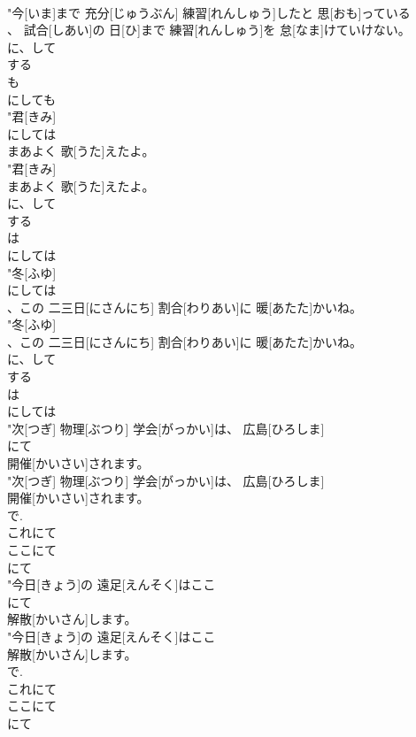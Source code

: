 \documentclass[8pt]{extreport}
\begin{document}
\begin{CJK}{UTF8}{min}
\\	"今[いま]まで 充分[じゅうぶん] 練習[れんしゅう]したと 思[おも]っている
\\	、 試合[しあい]の 日[ひ]まで 練習[れんしゅう]を 怠[なま]けていけない。
\\	に、して 
\\	する 
\\	も	
\\	にしても
\\	"君[きみ]
\\	にしては
\\	まあよく 歌[うた]えたよ。
\\	"君[きみ]
\\	まあよく 歌[うた]えたよ。
\\	に、して 
\\	する 
\\	は 
\\	にしては
\\	"冬[ふゆ]
\\	にしては
\\	、この 二三日[にさんにち] 割合[わりあい]に 暖[あたた]かいね。
\\	"冬[ふゆ]
\\	、この 二三日[にさんにち] 割合[わりあい]に 暖[あたた]かいね。
\\	に、して 
\\	する 
\\	は 
\\	にしては
\\	"次[つぎ] 物理[ぶつり] 学会[がっかい]は、 広島[ひろしま]
\\	にて
\\	開催[かいさい]されます。
\\	"次[つぎ] 物理[ぶつり] 学会[がっかい]は、 広島[ひろしま]
\\	開催[かいさい]されます。
\\	で. 
\\	これにて 
\\	ここにて 
\\	にて
\\	"今日[きょう]の 遠足[えんそく]はここ
\\	にて
\\	解散[かいさん]します。
\\	"今日[きょう]の 遠足[えんそく]はここ
\\	解散[かいさん]します。
\\	で. 
\\	これにて 
\\	ここにて 
\\	にて

\end{CJK}
\end{document}
